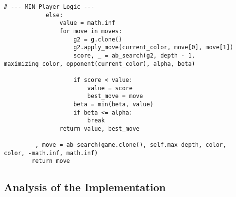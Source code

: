 \documentclass[11pt]{article}
\begin{document}
\begin{lstlisting}[style=pythonstyle]
            # --- MIN Player Logic ---
            else:
                value = math.inf
                for move in moves:
                    g2 = g.clone()
                    g2.apply_move(current_color, move[0], move[1])
                    score, _ = ab_search(g2, depth - 1, maximizing_color, opponent(current_color), alpha, beta)

                    if score < value:
                        value = score
                        best_move = move
                    beta = min(beta, value)
                    if beta <= alpha:
                        break
                return value, best_move

        _, move = ab_search(game.clone(), self.max_depth, color, color, -math.inf, math.inf)
        return move
\end{lstlisting}


\subsection{Analysis of the Implementation}
\end{document}
